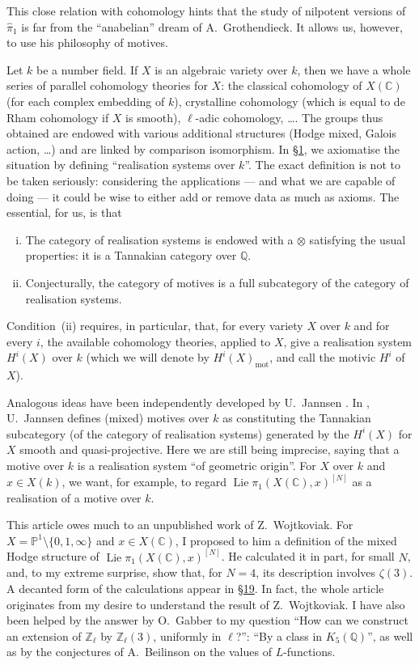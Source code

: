 \documentclass{article}
\theoremstyle{definition}
\newcommand{\mot}{\mathrm{mot}}
\newcommand{\bb}{\mathbb}
\newcommand{\PP}{\bb{P}}
\newcommand{\ZZ}{\bb{Z}}
\newcommand{\CC}{\bb{C}}
\newcommand{\QQ}{\bb{Q}}
\DeclareMathOperator{\Lie}{Lie}
\newcommand{\oldpage}[1]{\marginpar{\footnotesize$\Big\vert$ \textit{p.~#1}}}
\begin{document}
This close relation with cohomology hints that the study of nilpotent versions of $\hat{\pi}_1$ is far from the ``anabelian'' dream of A.~Grothendieck.
It allows us, however, to use his philosophy of motives.

Let $k$ be a number field.
If $X$ is an algebraic variety over $k$, then we have a whole series of parallel cohomology theories for $X$: the classical cohomology of $X(\CC)$ (for each complex embedding of $k$), crystalline cohomology (which is equal to de Rham cohomology if $X$ is smooth), $\ell$-adic cohomology, \ldots.
The groups thus obtained are endowed with various additional structures (Hodge mixed, Galois action, \ldots) and are linked by comparison isomorphism.
In \hyperref[1]{\S1}, we axiomatise the situation by defining ``realisation systems over $k$''.
The exact definition is not to be taken seriously: considering the applications --- and what we are capable of doing --- it could be wise to either add or remove data as much as axioms.
The essential, for us, is that
\begin{enumerate}[(i)]
  \item The category of realisation systems is endowed with a $\otimes$ satisfying the usual properties: it is a Tannakian category over $\QQ$.
  \item Conjecturally, the category of motives is a full subcategory of the category of realisation systems.
\end{enumerate}

Condition~(ii) requires, in particular, that, for every variety $X$ over $k$ and for every $i$, the available cohomology theories, applied to $X$, give a realisation system $H^i(X)$ over $k$ (which we will denote by $H^i(X)_\mot$, and call the motivic $H^i$ of $X$).

Analogous ideas have been independently developed by U.~Jannsen \cite{J}.
In \cite{J}, U.~Jannsen defines (mixed) motives over $k$ as constituting the Tannakian subcategory (of the category of realisation systems) generated by the $H^i(X)$ for $X$ smooth and quasi-projective.
Here we are still being imprecise, saying that a motive over $k$ is a realisation system ``of geometric origin''.
For $X$ over $k$ and $x\in X(k)$, we want, for example, to regard $\Lie\pi_1(X(\CC),x)^{[N]}$ as a realisation of a motive over $k$.

This article owes much to an unpublished work of Z.~Wojtkoviak.
For $X=\PP^1\setminus\{0,1,\infty\}$ and $x\in X(\CC)$, I proposed to him a definition of the mixed Hodge structure of $\Lie\pi_1(X(\CC),x)^{[N]}$.
He calculated it in part, for small $N$, and, to my extreme surprise, show that, for $N=4$, its description involves $\zeta(3)$.
A decanted form of the calculations appear in \hyperref[19]{\S19}.
In fact, the whole article originates from my desire to
\oldpage{5~(83)}
understand the result of Z.~Wojtkoviak.
I have also been helped by the answer by O.~Gabber to my question ``How can we construct an extension of $\ZZ_\ell$ by $\ZZ_\ell(3)$, uniformly in $\ell$?'': ``By a class in $K_5(\QQ)$'', as well as by the conjectures of A.~Beilinson on the values of $L$-functions.
\end{document}

